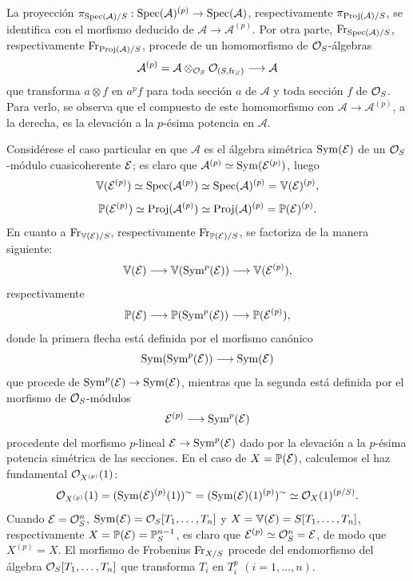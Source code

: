 La proyección $\pi_{\operatorname{Spec}(\mathcal{A})/S}:\operatorname{Spec}(\mathcal{A})^{(p)}\to\operatorname{Spec}(\mathcal{A})$, respectivamente $\pi_{\operatorname{Proj}(\mathcal{A})/S}$, se identifica con el morfismo deducido de $\mathcal{A}\to\mathcal{A}^{(p)}$. Por otra parte, $\operatorname{Fr}_{\operatorname{Spec}(\mathcal{A})/S}$, respectivamente $\operatorname{Fr}_{\operatorname{Proj}(\mathcal{A})/S}$, procede de un homomorfismo de $\mathcal{O}_S$-álgebras
\[
\mathcal{A}^{(p)}=\mathcal{A}\otimes_{\mathcal{O}_S}\mathcal{O}_{(S,\operatorname{fr}_S)}\longrightarrow \mathcal{A}
\]
que transforma $a\otimes f$ en $a^p f$ para toda sección $a$ de $\mathcal{A}$ y toda sección $f$ de $\mathcal{O}_S$. Para verlo, se observa que el compuesto de este homomorfismo con $\mathcal{A}\to\mathcal{A}^{(p)}$, a la derecha, es la elevación a la $p$-ésima potencia en $\mathcal{A}$.

Considérese el caso particular en que $\mathcal{A}$ es el álgebra simétrica $\operatorname{Sym}(\mathcal E)$ de un $\mathcal{O}_S$-módulo cuasicoherente $\mathcal E$; es claro que $\mathcal{A}^{(p)}\simeq\operatorname{Sym}(\mathcal E^{(p)})$, luego
\[
\mathbb V(\mathcal E^{(p)})\simeq\operatorname{Spec}(\mathcal{A}^{(p)})\simeq\operatorname{Spec}(\mathcal{A})^{(p)}=\mathbb V(\mathcal E)^{(p)},
\]
\[
\mathbb P(\mathcal E^{(p)})\simeq\operatorname{Proj}(\mathcal{A}^{(p)})\simeq\operatorname{Proj}(\mathcal{A})^{(p)}=\mathbb P(\mathcal E)^{(p)}.
\]
En cuanto a $\operatorname{Fr}_{\mathbb V(\mathcal E)/S}$, respectivamente $\operatorname{Fr}_{\mathbb P(\mathcal E)/S}$, se factoriza de la manera siguiente:
\[
\mathbb V(\mathcal E)\longrightarrow \mathbb V(\operatorname{Sym}^p(\mathcal E))\longrightarrow \mathbb V(\mathcal E^{(p)}),
\]
respectivamente
\[
\mathbb P(\mathcal E)\longrightarrow \mathbb P(\operatorname{Sym}^p(\mathcal E))\longrightarrow \mathbb P(\mathcal E^{(p)}),
\]
donde la primera flecha está definida por el morfismo canónico
\[
\operatorname{Sym}(\operatorname{Sym}^p(\mathcal E))\longrightarrow \operatorname{Sym}(\mathcal E)
\]
que procede de $\operatorname{Sym}^p(\mathcal E)\to\operatorname{Sym}(\mathcal E)$, mientras que la segunda está definida por el morfismo de $\mathcal{O}_S$-módulos
\[
\mathcal E^{(p)}\longrightarrow \operatorname{Sym}^p(\mathcal E)
\]
procedente del morfismo $p$-lineal $\mathcal E\to\operatorname{Sym}^p(\mathcal E)$ dado por la elevación a la $p$-ésima potencia simétrica de las secciones. En el caso de $X=\mathbb P(\mathcal E)$, calculemos el haz fundamental $\mathcal{O}_{X^{(p)}}(1)$:
\[
\mathcal{O}_{X^{(p)}}(1)=(\operatorname{Sym}(\mathcal E)^{(p)}(1))^{\sim}
=(\operatorname{Sym}(\mathcal E)(1)^{(p)})^{\sim}
\simeq \mathcal{O}_X(1)^{(p/S)}.
\]
Cuando $\mathcal E=\mathcal{O}_S^n$, $\operatorname{Sym}(\mathcal E)=\mathcal{O}_S[T_1,\ldots,T_n]$ y $X=\mathbb V(\mathcal E)=S[T_1,\ldots,T_n]$, respectivamente $X=\mathbb P(\mathcal E)=\mathbb P_S^{n-1}$, es claro que $\mathcal E^{(p)}\simeq\mathcal{O}_S^n=\mathcal E$, de modo que $X^{(p)}=X$. El morfismo de Frobenius $\operatorname{Fr}_{X/S}$ procede del endomorfismo del álgebra $\mathcal{O}_S[T_1,\ldots,T_n]$ que transforma $T_i$ en $T_i^p$ $(i=1,\ldots,n)$.

